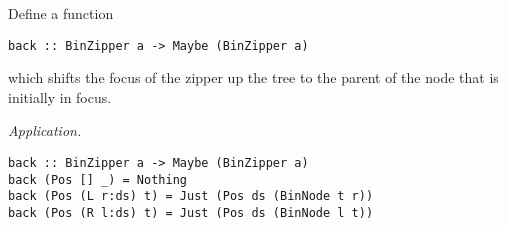 \begin{parts}
\begin{subparts}
        \subpart[3] Define a function 
        \vspace*{0.2cm}
        \begin{verbatim}
back :: BinZipper a -> Maybe (BinZipper a)
        \end{verbatim}
        \vspace*{0.2cm}	
        which shifts the focus of the zipper up the tree to the parent of the node that is initially in focus. \droppoints 
        
        \begin{solution}
            \emph{Application.} 
            \begin{small}
                \begin{verbatim}
back :: BinZipper a -> Maybe (BinZipper a)
back (Pos [] _) = Nothing 
back (Pos (L r:ds) t) = Just (Pos ds (BinNode t r))
back (Pos (R l:ds) t) = Just (Pos ds (BinNode l t))
                \end{verbatim}
            \end{small}
        \end{solution}
        
    \end{subparts}
\end{parts}